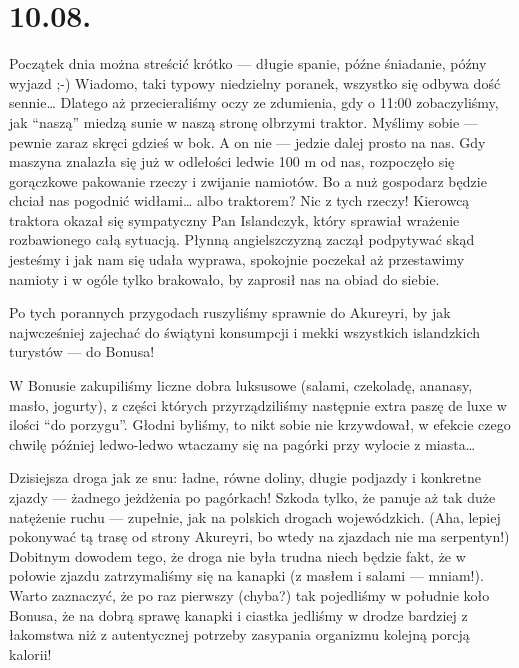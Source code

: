 \chapter*{10.08.}

Początek dnia można streścić krótko --- długie spanie, późne śniadanie, późny wyjazd ;-) Wiadomo, taki typowy niedzielny poranek, wszystko się odbywa dość sennie… Dlatego aż przecieraliśmy oczy ze zdumienia, gdy o 11:00 zobaczyliśmy, jak “naszą” miedzą sunie w naszą stronę olbrzymi traktor. Myślimy sobie --- pewnie zaraz skręci gdzieś w bok. A on nie --- jedzie dalej prosto na nas. Gdy maszyna znalazła się już w odlełości ledwie 100 m od nas, rozpoczęło się gorączkowe pakowanie rzeczy i zwijanie namiotów. Bo a nuż gospodarz będzie chciał nas pogodnić widłami… albo traktorem? Nic z tych rzeczy! Kierowcą traktora okazał się sympatyczny Pan Islandczyk, który sprawiał wrażenie rozbawionego całą sytuacją. Płynną angielszczyzną zaczął podpytywać skąd jesteśmy i jak nam się udała wyprawa, spokojnie poczekał aż przestawimy namioty i w ogóle tylko brakowało, by zaprosił nas na obiad do siebie.

Po tych porannych przygodach ruszyliśmy sprawnie do Akureyri, by jak najwcześniej zajechać do świątyni konsumpcji i mekki wszystkich islandzkich turystów --- do Bonusa!


W Bonusie zakupiliśmy liczne dobra luksusowe (salami, czekoladę, ananasy, masło, jogurty), z części których przyrządziliśmy następnie extra paszę de luxe w ilości “do porzygu”. Głodni byliśmy, to nikt sobie nie krzywdował, w efekcie czego chwilę później ledwo-ledwo wtaczamy się na pagórki przy wylocie z miasta…


Dzisiejsza droga jak ze snu: ładne, równe doliny, długie podjazdy i konkretne zjazdy --- żadnego jeżdżenia po pagórkach! Szkoda tylko, że panuje aż tak duże natężenie ruchu --- zupełnie, jak na polskich drogach wojewódzkich. (Aha, lepiej pokonywać tą trasę od strony Akureyri, bo wtedy na zjazdach nie ma serpentyn!) Dobitnym dowodem tego, że droga nie była trudna niech będzie fakt, że w połowie zjazdu zatrzymaliśmy się na kanapki (z masłem i salami --- mniam!). Warto zaznaczyć, że po raz pierwszy (chyba?) tak pojedliśmy w południe koło Bonusa, że na dobrą sprawę kanapki i ciastka jedliśmy w drodze bardziej z łakomstwa niż z autentycznej potrzeby zasypania organizmu kolejną porcją kalorii!

